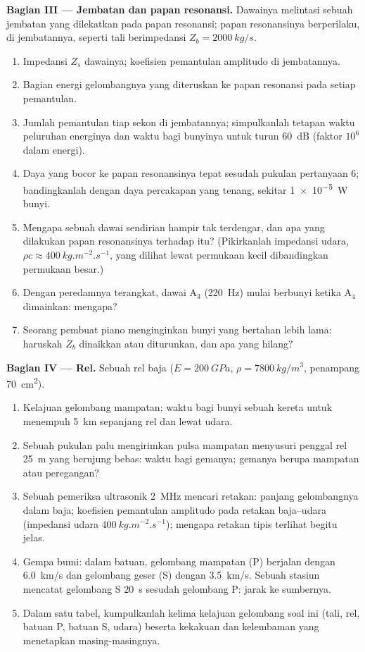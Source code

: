 \begin{problem}
\medskip
\noindent\textbf{Bagian III --- Jembatan dan papan resonansi.}
Dawainya melintasi sebuah jembatan yang dilekatkan pada papan resonansi; papan resonansinya
berperilaku, di jembatannya, seperti tali berimpedansi $Z_b = \qty{2000}{kg/s}$.
\begin{enumerate}[resume]
  \item Impedansi $Z_s$ dawainya; koefisien pemantulan amplitudo
        di jembatannya.
  \item Bagian energi gelombangnya yang diteruskan ke papan resonansi pada
        setiap pemantulan.
  \item Jumlah pemantulan tiap sekon di jembatannya; simpulkanlah tetapan
        waktu peluruhan energinya dan waktu bagi bunyinya untuk turun
        \qty{60}{dB} (faktor $10^6$ dalam energi).
  \item Daya yang bocor ke papan resonansinya tepat sesudah pukulan
        pertanyaan 6; bandingkanlah dengan daya percakapan yang tenang,
        sekitar \qty{1e-5}{W} bunyi.
  \item Mengapa sebuah dawai sendirian hampir tak terdengar, dan apa yang
        dilakukan papan resonansinya terhadap itu? (Pikirkanlah impedansi udara,
        $\rho c \approx \qty{400}{kg.m^{-2}.s^{-1}}$, yang dilihat lewat permukaan
        kecil dibandingkan permukaan besar.)
  \item Dengan peredamnya terangkat, dawai A$_3$ (\qty{220}{Hz}) mulai
        berbunyi ketika A$_4$ dimainkan: mengapa?
  \item Seorang pembuat piano menginginkan bunyi yang bertahan lebih lama: haruskah $Z_b$ dinaikkan atau
        diturunkan, dan apa yang hilang?
\end{enumerate}

\medskip
\noindent\textbf{Bagian IV --- Rel.}
Sebuah rel baja ($E = \qty{200}{GPa}$, $\rho = \qty{7800}{kg/m^3}$, penampang
\qty{70}{cm^2}).
\begin{enumerate}[resume]
  \item Kelajuan gelombang mampatan; waktu bagi bunyi sebuah kereta untuk
        menempuh \qty{5}{km} sepanjang rel dan lewat udara.
  \item Sebuah pukulan palu mengirimkan pulsa mampatan menyusuri penggal rel
        \qty{25}{m} yang berujung bebas: waktu bagi gemanya; gemanya berupa
        mampatan atau peregangan?
  \item Sebuah pemeriksa ultrasonik \qty{2}{MHz} mencari retakan: panjang gelombangnya dalam
        baja; koefisien pemantulan amplitudo pada retakan baja--udara
        (impedansi udara $\qty{400}{kg.m^{-2}.s^{-1}}$); mengapa retakan
        tipis terlihat begitu jelas.
  \item Gempa bumi: dalam batuan, gelombang mampatan (P) berjalan dengan
        \qty{6.0}{km/s} dan gelombang geser (S) dengan \qty{3.5}{km/s}. Sebuah stasiun
        mencatat gelombang S \qty{20}{s} sesudah gelombang P: jarak ke
        sumbernya.
  \item Dalam satu tabel, kumpulkanlah kelima kelajuan gelombang soal ini
        (tali, rel, batuan P, batuan S, udara) beserta kekakuan dan
        kelembaman yang menetapkan masing-masingnya.
\end{enumerate}
\end{problem}
